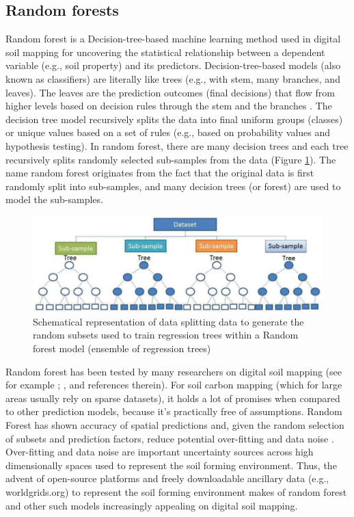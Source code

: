 \documentclass[10pt,b5paper,]{book}
\theoremstyle{definition}
\theoremstyle{definition}
\theoremstyle{definition}
\theoremstyle{remark}
\begin{document}
\hypertarget{random-forests}{%
\subsection{Random forests}\label{random-forests}}

Random forest is a Decision-tree-based machine learning method used in
digital soil mapping for uncovering the statistical relationship between
a dependent variable (e.g., soil property) and its predictors.
Decision-tree-based models (also known as classifiers) are literally
like trees (e.g., with stem, many branches, and leaves). The leaves are
the prediction outcomes (final decisions) that flow from higher levels
based on decision rules through the stem and the branches
\citep{breiman1984classification}. The decision tree model recursively
splits the data into final uniform groups (classes) or unique values
based on a set of rules (e.g., based on probability values and
hypothesis testing). In random forest, there are many decision trees and
each tree recursively splits randomly selected sub-samples from the data
(Figure \ref{fig:rfschema}). The name random forest originates from the
fact that the original data is first randomly split into sub-samples,
and many decision trees (or forest) are used to model the sub-samples.

\begin{figure}

{\centering \includegraphics[width=0.8\linewidth]{images/randomForestconcept} 

}

\caption{Schematical representation of data splitting data to generate the random subsets used to train regression trees within a Random forest model (ensemble of regression trees)}\label{fig:rfschema}
\end{figure}

Random forest has been tested by many researchers on digital soil
mapping (see for example \citet{poggio2013regional};
\citet{rad2014updating}, and references therein). For soil carbon
mapping (which for large areas usually rely on sparse datasets), it
holds a lot of promises when compared to other prediction models,
because it's practically free of assumptions. Random Forest has shown
accuracy of spatial predictions and, given the random selection of
subsets and prediction factors, reduce potential over-fitting and data
noise \citep{wiesmeier2011digital}. Over-fitting and data noise are
important uncertainty sources across high dimensionally spaces used to
represent the soil forming environment. Thus, the advent of open-source
platforms and freely downloadable ancillary data (e.g., worldgrids.org)
to represent the soil forming environment makes of random forest and
other such models increasingly appealing on digital soil mapping.
\end{document}
